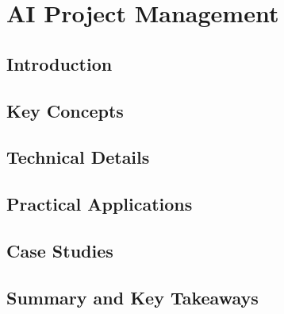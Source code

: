 ﻿%

\chapter{AI Project Management}
\label{ch:chapter-25}

\section{Introduction}


\section{Key Concepts}


\section{Technical Details}


\section{Practical Applications}


\section{Case Studies}


\section{Summary and Key Takeaways}


